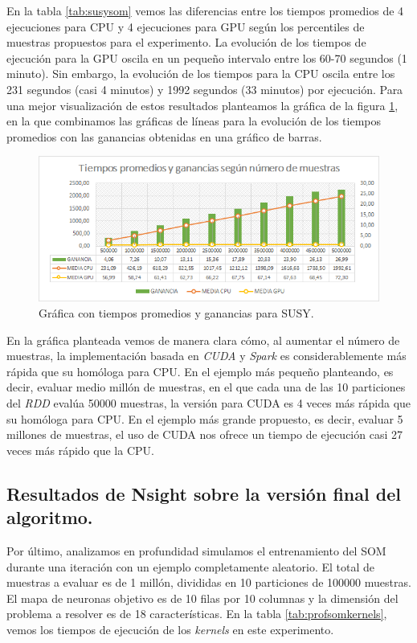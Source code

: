 En la tabla \ref{tab:susysom} vemos las diferencias entre los tiempos promedios de 4 ejecuciones para CPU y 4 ejecuciones para GPU según los percentiles de muestras propuestos para el experimento. La evolución de los tiempos de ejecución para la GPU oscila en un pequeño intervalo entre los 60-70 segundos (1 minuto). Sin embargo, la evolución de los tiempos para la CPU oscila entre los 231 segundos (casi 4 minutos) y 1992 segundos (33 minutos) por ejecución.  Para una mejor visualización de estos resultados planteamos la gráfica de la figura \ref{img:somsusy}, en la que combinamos las gráficas de líneas para la evolución de los tiempos promedios con las ganancias obtenidas en una gráfico de barras. \\

\begin{figure}[ht]
\centering
\includegraphics[scale=0.7]{imagenes/susysom.png}
\caption{Gráfica con tiempos promedios y ganancias para SUSY.}
\label{img:somsusy}
\end{figure}

En la gráfica planteada vemos de manera clara cómo, al aumentar el número de muestras, la implementación basada en \textit{CUDA} y \textit{Spark} es considerablemente más rápida que su homóloga para CPU. En el ejemplo más pequeño planteando, es decir, evaluar medio millón de muestras, en el que cada una de las 10 particiones del \textit{RDD} evalúa 50000 muestras, la versión para CUDA es 4 veces más rápida que su homóloga para CPU. En el ejemplo más grande propuesto, es decir, evaluar 5 millones de muestras, el uso de CUDA nos ofrece un tiempo de ejecución casi 27 veces más rápido que la CPU.


\subsection{Resultados de Nsight sobre la versión final del algoritmo.}
Por último, analizamos en profundidad simulamos el entrenamiento del SOM durante una iteración con un ejemplo completamente aleatorio. El total de muestras a evaluar es de 1 millón, divididas en 10 particiones de 100000 muestras. El mapa de neuronas objetivo es de 10 filas por 10 columnas y la dimensión del problema a resolver es de 18 características. En la tabla \ref{tab:profsomkernels}, vemos los tiempos de ejecución de los \textit{kernels} en este experimento.\\

